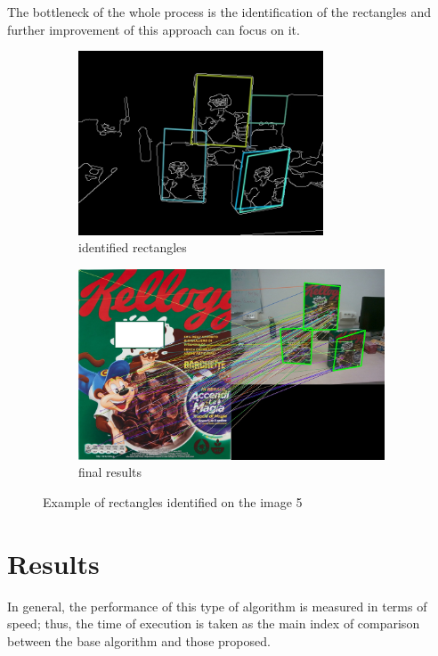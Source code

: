 \documentclass{article}
\begin{document}
The bottleneck of the whole process is the identification of the rectangles and further improvement of this approach can focus on it.
\begin{figure}[H]
    \begin{subfigure}[b]{0.5\textwidth}
        \centering
        \includegraphics[width=0.8\textwidth]{image/rectangles-example.jpg}
        \caption{identified rectangles}
    \end{subfigure}
    \begin{subfigure}[b]{0.5\textwidth}
        \centering
        \includegraphics[width=\textwidth]{image/barchette_5_rettangoli.jpg}
        \caption{final results}
    \end{subfigure}
    \caption{Example of rectangles identified on the image 5}
    
\end{figure}


\section{Results} %
\label{results}
In general, the performance of this type of algorithm is measured in terms of speed; thus, the time of execution is taken as the main index of comparison between the base algorithm and those proposed.
\end{document}
